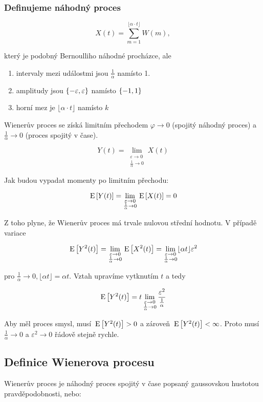 \subsubsection*{Definujeme náhodný proces}
\[ X(t)=\sum_{m=1}^{\lfloor\alpha\cdot t\rfloor} W(m), \]

který je podobný Bernoulliho náhodné procházce, ale

\begin{enumerate}[label=\roman*)]
\item intervaly mezi událostmi jsou $\frac{1}{\alpha}$ namísto 1.
\item amplitudy jsou $\left\{-\varepsilon,\varepsilon\right\}$ namísto $\left\{-1,1\right\}$
\item horní mez je $\lfloor\alpha\cdot t\rfloor$ namísto $k$
\end{enumerate}

Wienerův proces se získá limitním přechodem $\varphi\to 0$ (spojitý náhodný proces) a $\frac{1}{\alpha}\to 0$ (proces spojitý v čase).

\[ Y(t) = \lim_{\substack{\varepsilon\to 0\\ \frac{1}{\alpha}\to 0}} X(t) \]

Jak budou vypadat momenty po limitním přechodu:

\[ \,\mathrm{E}\left[Y(t)\right] = \lim_{\substack{\varepsilon\to 0\\ \frac{1}{\alpha}\to 0}} \,\mathrm{E}\left[X(t)\right]=0 \]

Z toho plyne, že Wienerův proces má trvale nulovou střední hodnotu. V případě variace

\[ \,\mathrm{E}\left[Y^2(t)\right] = \lim_{\substack{\varepsilon\to 0\\ \frac{1}{\alpha}\to 0}} \,\mathrm{E}\left[X^2(t)\right]=\lim_{\substack{\varepsilon\to 0\\ \frac{1}{\alpha}\to 0}} \lfloor\alpha t\rfloor \varepsilon^2 \]

pro $\frac{1}{\alpha}\to 0, \lfloor\alpha t\rfloor=\alpha t$. Vztah upravíme vytknutím $t$ a tedy

\[ \,\mathrm{E}\left[Y^2(t)\right] = t \lim_{\substack{\varepsilon\to 0\\ \frac{1}{\alpha}\to 0}} \frac{\varepsilon^2}{\frac{1}{\alpha}} \]

Aby měl proces smysl, musí $\,\mathrm{E}\left[Y^2(t)\right]>0$ a zároveň $\,\mathrm{E}\left[Y^2(t)\right]<\infty$. Proto musí $\frac{1}{\alpha}\to 0$ a $\varepsilon^2\to 0$ řádově stejně rychle.

\subsection{Definice Wienerova procesu}
Wienerův proces je náhodný proces spojitý v čase popsaný gaussovskou hustotou pravděpodobnosti, nebo:

